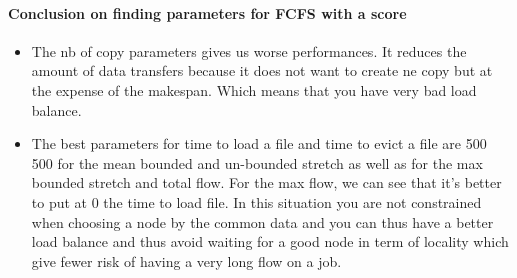 \documentclass[a4paper]{article}
\begin{document}

\paragraph {Conclusion on finding parameters for FCFS with a score}
\begin{itemize}
	\item The nb of copy parameters gives us worse performances. It reduces
	the amount of data transfers because it does not want to create ne copy but at the expense of the makespan. Which means that 
	you have very bad load balance.
	\item The best parameters for time to load a file and time to evict a file are 500 500 for the mean bounded and un-bounded stretch as well as for the max bounded stretch and total flow. For the max flow, we can see that it's better to put at 0 the time to load file. In this situation you are not constrained when choosing a node by the common data and you can thus have a better load balance and thus avoid waiting for a good node in term of locality which give fewer risk of having a very long flow on a job.
\end{itemize}
\end{document}
